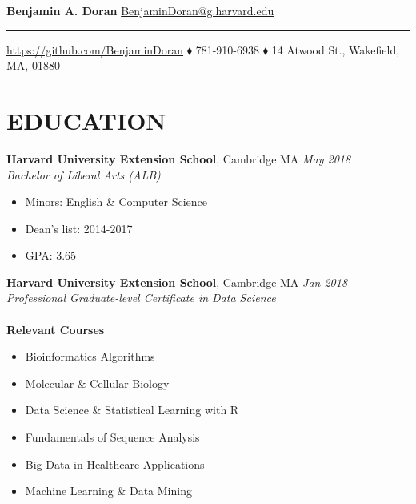 \documentclass[hidelinks, 10pt]{article}
\begin{document}
\newcommand{\sectiontext}[1]{\bf\color{sectioncolor}#1}
\newcommand{\titletext}[1]{{\large\bf #1}}
\newcommand{\experiencetitle}[4]{
\titletext{#1}, {#2}  \hspace*{\fill} \emph{#3} \\ 
\emph{#4}\vspace{-6pt}
}

\begin{center}
{\huge\bf Benjamin A. Doran} \hspace*{\fill}  
{\color{blue} \href{mailto://BenjaminDoran@g.harvard.edu}{\large BenjaminDoran@g.harvard.edu}}
\hrule
\vspace{6pt}
{\color{blue}\url{https://github.com/BenjaminDoran}} $\blacklozenge$ 781-910-6938 $\blacklozenge$ 14 Atwood St., Wakefield, MA, 01880
\end{center}


\section*{\sectiontext{EDUCATION}}
\begin{addmargin}{.5in}

  \experiencetitle{Harvard University Extension School}{Cambridge MA}{May 2018}{Bachelor of Liberal Arts (ALB)}
  \begin{itemize}\setlength\itemsep{-4pt}
    \item{Minors: English $\&$ Computer Science}
    \item{Dean's list: 2014-2017}
    \item{GPA: 3.65}
  \end{itemize}

  \experiencetitle{Harvard University Extension School}{Cambridge MA}{Jan 2018}{Professional Graduate-level Certificate in
  Data Science} \\ \\

  \titletext{Relevant Courses}
  \vspace{-9pt}
  \begin{multicols}{2}
    \begin{itemize}\setlength\itemsep{-4pt}
      \item{Bioinformatics Algorithms}
      \item{Molecular $\&$ Cellular Biology}
      \item{Data Science $\&$ Statistical Learning with R}
      \item{Fundamentals of Sequence Analysis}
      \item{Big Data in Healthcare Applications}
      \item{Machine Learning $\&$ Data Mining}
    \end{itemize}
  \end{multicols}
\end{addmargin}
\end{document}
